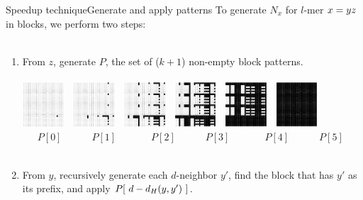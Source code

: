 \documentclass[pdf,xcolor={dvipsnames}]{beamer}
\begin{document}
	\begin{frame}{Speedup technique}{Generate and apply patterns}
		To generate $N_x$ for $l$-mer $x={\color{black}y}{\color{black}z}$ in blocks, we perform two steps:\\\ \\
		\begin{enumerate}
		\item From {\color{black} $z$}, generate $P$, the set of ($k+1$) non-empty block patterns.\\\ \\
		\includegraphics[width=0.12\textwidth]{img/0.png}\ \ 
		\includegraphics[width=0.12\textwidth]{img/1.png}\ \ 
		\includegraphics[width=0.12\textwidth]{img/2.png}\ \ 
		\includegraphics[width=0.12\textwidth]{img/3.png}\ \ 
		\includegraphics[width=0.12\textwidth]{img/4.png}\ \ 
		\includegraphics[width=0.12\textwidth]{img/5.png}\ \ 
		\\
		\ \ \ $P[0]$\ \ \ 
		\ \ \ $P[1]$\ \ \ \
		\ \ \ $P[2]$\ \ \
		\ \ \ $P[3]$\ \ \ \  
		\ \ \ $P[4]$\ \ \ 
		\ \ \ $P[5]$
		\\\ \\
		\item From {\color{black} $y$}, recursively generate each $d$-neighbor $y'$, find the block that has $y'$ as its prefix, and apply $P[\ {\color{black}d - d_H(y,y')}\ ] $.
		\end{enumerate}
	\end{frame}
\end{document}
